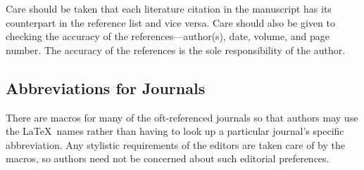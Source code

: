 \documentclass[11pt,twoside]{article}
\begin{document}
Care should be taken that each literature citation in the manuscript
has its counterpart in the reference list and vice versa.  Care should
also be given to checking the accuracy of the references---author(s),
date, volume, and page number.  The accuracy of the references is the
sole responsibility of the author.

\subsection{Abbreviations for Journals}

There are macros for many of the oft-referenced journals so that authors
may use the \LaTeX\ names rather than having to look up a particular
journal's specific abbreviation.  Any stylistic requirements of the
editors are taken care of by the macros, so authors need not be concerned
about such editorial preferences.
\end{document}
